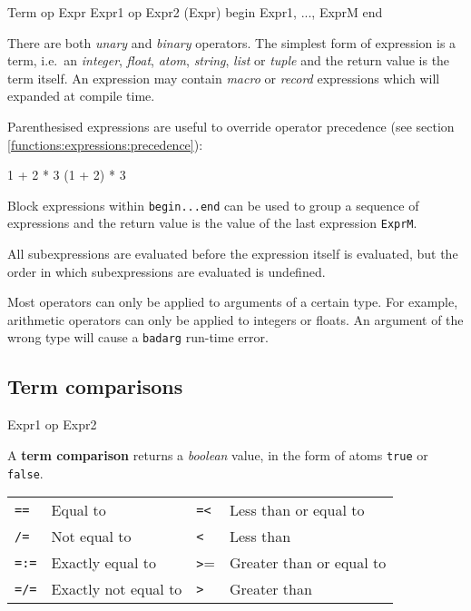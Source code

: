 \begin{erlang}
Term
op Expr
Expr1 op Expr2
(Expr)
begin
   Expr1,
   ...,
   ExprM            %
end

\end{erlang}

There are both \textit{unary} and \textit{binary} operators. The
simplest form of expression is a term, i.e.~an \textit{integer},
\textit{float}, \textit{atom}, \textit{string}, \textit{list} or
\textit{tuple} and the return value is the term itself. An expression
may contain \textit{macro} or \textit{record} expressions which will
expanded at compile time.

Parenthesised expressions are useful to override operator precedence (see section \ref{functions:expressions:precedence}):

\begin{erlang}
1 + 2 * 3           %
(1 + 2) * 3         %
\end{erlang}

Block expressions within \texttt{begin...end} can be used to group a
sequence of expressions and the return value is the value of the last
expression \texttt{ExprM}.

All subexpressions are evaluated before the expression itself is
evaluated, but the order in which subexpressions are evaluated is undefined.

Most operators can only be applied to arguments of a certain type. For
example, arithmetic operators can only be applied to integers or
floats. An argument of the wrong type will cause a \texttt{badarg}
run-time error.


\subsection{Term comparisons}
\begin{erlang}
Expr1 op Expr2
\end{erlang}

A \textbf{term comparison} returns a \textit{boolean} value,
in the form of atoms \texttt{true} or \texttt{false}.

\begin{center}
\begin{tabular}{|>{\raggedright}p{40pt}|>{\raggedright}p{105pt}|>{\raggedright}p{26pt}|>{\raggedright}p{124pt}|}
\hline
\multicolumn{4}{|p{297pt}|}{Comparison operators}\tabularnewline
\hline
\texttt{==} & Equal to & \texttt{=<} & Less than or equal to\tabularnewline
\hline
\texttt{/=} & Not equal to & \texttt{<} & Less than\tabularnewline
\hline
\texttt{=:=} & Exactly equal to & \texttt{>}= & Greater than or equal to\tabularnewline
\hline
\texttt{=/=} & Exactly not equal to & \texttt{>} & Greater than\tabularnewline
\hline
\end{tabular}
\end{center}

